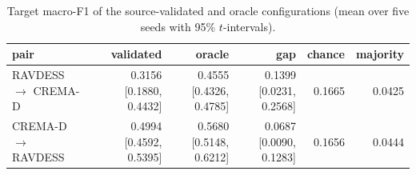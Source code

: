 \begin{table}[!t]
  \centering
  \setlength{\tabcolsep}{5pt}
  \caption{Target macro-F1 of the source-validated and oracle configurations (mean over five seeds with 95\% $t$-intervals).}
  \label{tab:headline}
  \begin{tabular}{lrrrrr}
    \toprule
    pair & validated & oracle & gap & chance & majority \\
    \midrule
    RAVDESS $\rightarrow$ CREMA-D & 0.3156 [0.1880, 0.4432] & 0.4555 [0.4326, 0.4785] & 0.1399 [0.0231, 0.2568] & 0.1665 & 0.0425 \\
    CREMA-D $\rightarrow$ RAVDESS & 0.4994 [0.4592, 0.5395] & 0.5680 [0.5148, 0.6212] & 0.0687 [0.0090, 0.1283] & 0.1656 & 0.0444 \\
    \bottomrule
  \end{tabular}
\end{table}
